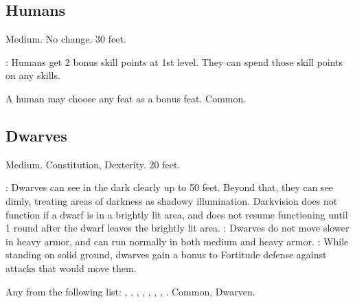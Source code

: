 \subsection{Humans}
 Medium.
 No change.
 30 feet.
\begin{itemize}
    : Humans get 2 bonus skill points at 1st level. They can spend those skill points on any skills.
\end{itemize}
 A human may choose any feat as a bonus feat.
 Common.

\subsection{Dwarves}
 Medium.
  Constitution,  Dexterity.
 20 feet.
\begin{itemize}
    : Dwarves can see in the dark clearly up to 50 feet.   Beyond that, they can see dimly, treating areas of darkness as shadowy illumination. Darkvision does not function if a dwarf is in a brightly lit area, and does not resume functioning until 1 round after the dwarf leaves the brightly lit area.
    : Dwarves do not move slower in heavy armor, and can run normally in both medium and heavy armor.
    : While standing on solid ground, dwarves gain a  bonus to Fortitude defense against attacks that would move them.
\end{itemize}
 Any from the following list: , , , , , , , .
 Common, Dwarven.

